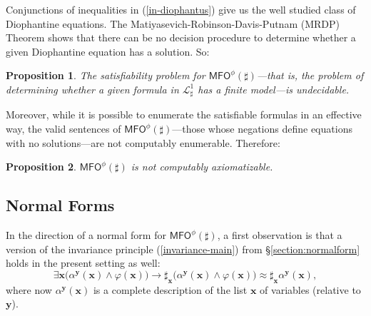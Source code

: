\documentclass[12pt,oneside,reqno]{amsart}
\newtheorem{proposition}{Proposition}
\theoremstyle{definition}
\begin{document}
Conjunctions of inequalities in (\ref{in-diophantus}) give us the well studied class of Diophantine equations. The Matiyasevich-Robinson-Davis-Putnam (MRDP) Theorem shows that there can be no decision procedure to determine whether a given Diophantine equation has a solution. So:
\begin{proposition} The satisfiability problem for $\mathsf{MFO}^{\phi}(\sharp)$---that is, the problem of determining whether a given formula in $\mathcal{L}^1_{\sharp}$ has a finite model---is undecidable. 
\end{proposition} 
Moreover, while it is possible to enumerate the satisfiable formulas in an effective way, the valid sentences of $\mathsf{MFO}^{\phi}(\sharp)$---those whose negations define equations with no solutions---are not computably enumerable. Therefore:
\begin{proposition} $\mathsf{MFO}^{\phi}(\sharp)$ is not computably axiomatizable. 
\end{proposition}




\subsection{Normal Forms} In the direction of a normal form for $\mathsf{MFO}^{\phi}(\sharp)$, a first observation is that a version of the invariance principle (\ref{invariance-main}) from \S\ref{section:normalform} holds in the present setting as well:\vspace{1mm} \begin{equation*} \exists \mathbf{x} \big(\alpha^{\mathbf{y}}(\mathbf{x}) \wedge \varphi(\mathbf{x})\big) \rightarrow \sharp_{\mathbf{x}} \big( \alpha^{\mathbf{y}}(\mathbf{x}) \wedge \varphi(\mathbf{x})\big) \approx \sharp_{\mathbf{x}} \alpha^{\mathbf{y}}(\mathbf{x}),
    \label{invariance:multiple}
\end{equation*}\vspace{1mm} where now $\alpha^{\mathbf{y}}(\mathbf{x})$ is a complete description of the list $\mathbf{x}$ of variables (relative to $\mathbf{y}$). 
\end{document}
